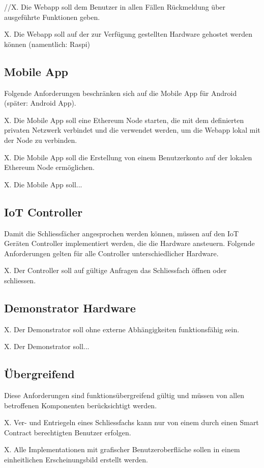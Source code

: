 //X. Die Webapp soll dem Benutzer in allen Fällen Rückmeldung über ausgeführte Funktionen geben.

X. Die Webapp soll auf der zur Verfügung gestellten Hardware gehostet werden können (namentlich: Raspi)

\subsection{Mobile App}
Folgende Anforderungen beschränken sich auf die Mobile App für Android (später: Android App).

X. Die Mobile App soll eine Ethereum Node starten, die mit dem definierten privaten Netzwerk verbindet und die verwendet werden, um die Webapp lokal mit der Node zu verbinden.

X. Die Mobile App soll die Erstellung von einem Benutzerkonto auf der lokalen Ethereum Node ermöglichen.

X. Die Mobile App soll...

\subsection{IoT Controller}
Damit die Schliessfächer angesprochen werden können, müssen auf den IoT Geräten Controller implementiert werden, die die Hardware ansteuern. Folgende Anforderungen gelten für alle Controller unterschiedlicher Hardware.

X. Der Controller soll auf gültige Anfragen das Schliessfach öffnen oder schliessen.

\subsection{Demonstrator Hardware}


X. Der Demonstrator soll ohne externe Abhängigkeiten funktionsfähig sein.

X. Der Demonstrator soll...

\subsection{Übergreifend}
Diese Anforderungen sind funktionsübergreifend gültig und müssen von allen betroffenen Komponenten berücksichtigt werden.

X. Ver- und Entriegeln eines Schliessfachs kann nur von einem durch einen Smart Contract berechtigten Benutzer erfolgen.

X. Alle Implementationen mit grafischer Benutzeroberfläche sollen in einem einheitlichen Erscheinungsbild erstellt werden.

